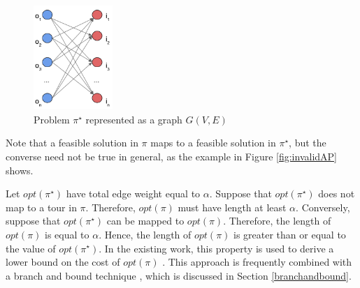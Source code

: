 \documentclass{mprop}
\theoremstyle{definition}
\begin{document}
\begin{figure}
\centering
\includegraphics[width = 3cm, height = 4cm]{images/tspbipartite.png}
\caption{Problem $\pi^{\star}$ represented as a graph $G(V,E)$}
\label{fig:tspbipartite}
\end{figure}

Note that a feasible solution in $\pi$ maps to a feasible solution in $\pi^{\star}$, but the converse need not be true in general, as the example in Figure \ref{fig:invalidAP} shows.

Let $opt(\pi^{\star})$ have total edge weight equal to $\alpha$. Suppose that $opt(\pi^{\star})$ does not map to a tour in $\pi$. Therefore, $opt(\pi)$ must have length at least $\alpha$. Conversely, suppose that $opt(\pi^{\star})$ can be mapped to $opt(\pi)$. Therefore, the length of $opt(\pi)$ is equal to $\alpha$. Hence, the length of $opt(\pi)$ is greater than or equal to the value of $opt(\pi^{\star})$.
In the existing work, this property is used to derive a lower bound on the cost of $opt(\pi)$ \citep{Jonker80,Dantzig54,Dantzig59}. This approach is frequently combined with a branch and bound technique \citep{tspbible}, which is discussed in Section \ref{branchandbound}.



\end{document}
